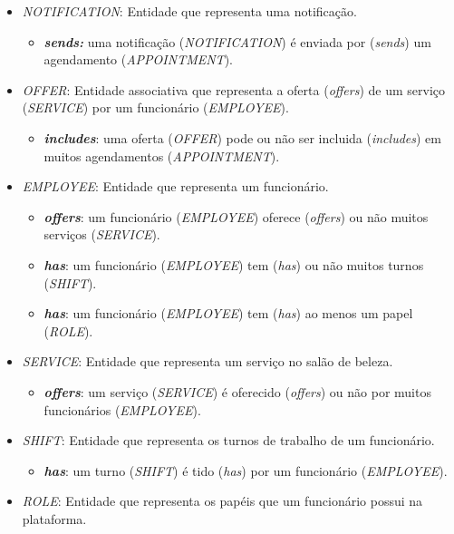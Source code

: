 \begin{itemize}
	\item \emph{NOTIFICATION}: Entidade que representa uma notificação.
	\begin{itemize}
		\item \textbf{\textit{sends:}} uma notificação (\emph{NOTIFICATION}) é enviada por (\textit{sends}) um agendamento (\emph{APPOINTMENT}).
	\end{itemize}
	\item \emph{OFFER}: Entidade associativa que representa a oferta (\textit{offers}) de um serviço (\emph{SERVICE}) por um funcionário (\emph{EMPLOYEE}).
	\begin{itemize}
		\item \textbf{\textit{includes}}: uma oferta (\emph{OFFER}) pode ou não ser incluida (\textit{includes}) em muitos agendamentos (\emph{APPOINTMENT}). 
	\end{itemize}
	\item \emph{EMPLOYEE}: Entidade que representa um funcionário.
	\begin{itemize}
		\item \textbf{\textit{offers}}: um funcionário (\emph{EMPLOYEE}) oferece (\textit{offers}) ou não muitos serviços (\emph{SERVICE}).
		\item \textbf{\textit{has}}: um funcionário (\emph{EMPLOYEE}) tem (\textit{has}) ou não muitos turnos (\emph{SHIFT}).
		\item \textbf{\textit{has}}: um funcionário (\emph{EMPLOYEE}) tem (\textit{has}) ao menos um papel (\emph{ROLE}).
	\end{itemize}
	\item \emph{SERVICE}: Entidade que representa um serviço no salão de beleza.
	\begin{itemize}
		\item \textbf{\textit{offers}}: um serviço (\emph{SERVICE}) é oferecido (\textit{offers}) ou não por muitos funcionários (\emph{EMPLOYEE}).
	\end{itemize}
	\item \emph{SHIFT}: Entidade que representa os turnos de trabalho de um funcionário.
	\begin{itemize}
		\item \textbf{\textit{has}}: um turno (\emph{SHIFT}) é tido (\textit{has}) por um funcionário (\emph{EMPLOYEE}).
	\end{itemize}
	\item \emph{ROLE}: Entidade que representa os papéis que um funcionário possui na plataforma.
	\begin{itemize}

\end{itemize}
\end{itemize}
